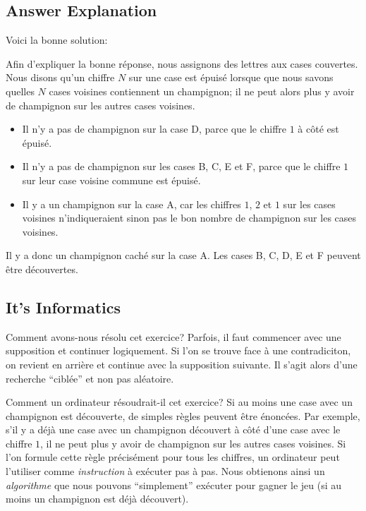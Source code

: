 \documentclass[a4paper,11pt]{report}
\newcommand{\taskGraphicsFolder}{..}
\begin{document}
\subsection*{Answer Explanation}

Voici la bonne solution:

{\centering%
\par}

Afin d’expliquer la bonne réponse, nous assignons des lettres aux cases couvertes. Nous disons qu’un chiffre ${N}$ sur une case est épuisé lorsque que nous savons quelles ${N}$ cases voisines contiennent un champignon; il ne peut alors plus y avoir de champignon sur les autres cases voisines.

{\centering%
\par}

\begin{itemize}
  \item Il n’y a pas de champignon sur la case D, parce que le chiffre $1$ à côté est épuisé.
  \item Il n’y a pas de champignon sur les cases B, C, E et F, parce que le chiffre $1$ sur leur case voisine commune est épuisé.
  \item Il y a un champignon sur la case A, car les chiffres $1$, $2$ et $1$ sur les cases voisines n’indiqueraient sinon pas le bon nombre de champignon sur les cases voisines.
\end{itemize}

{\centering%
\par}

Il y a donc un champignon caché sur la case A. Les cases B, C, D, E et F peuvent être découvertes.


\subsection*{It’s Informatics}

Comment avons-nous résolu cet exercice? Parfois, il faut commencer avec une supposition et continuer logiquement. Si l’on se trouve face à une contradiciton, on revient en arrière et continue avec la supposition suivante. Il s’agit alors d’une recherche “ciblée” et non pas aléatoire.

Comment un ordinateur résoudrait-il cet exercice? Si au moins une case avec un champignon est découverte, de simples règles peuvent être énoncées. Par exemple, s’il y a déjà une case avec un champignon découvert à côté d’une case avec le chiffre $1$, il ne peut plus y avoir de champignon sur les autres cases voisines. Si l’on formule cette règle précisément pour tous les chiffres, un ordinateur peut l’utiliser comme \emph{instruction} à exécuter pas à pas. Nous obtienons ainsi un \emph{algorithme} que nous pouvons “simplement” exécuter pour gagner le jeu (si au moins un champignon est déjà découvert).
\end{document}
